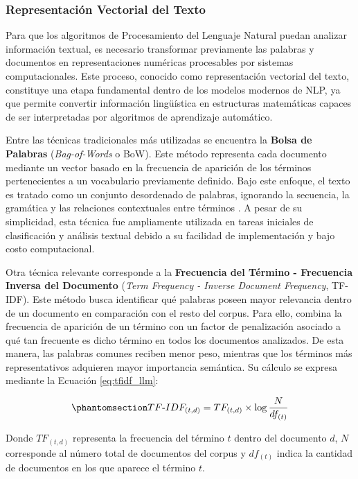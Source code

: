 \subsubsection{Representación Vectorial del Texto}

Para que los algoritmos de Procesamiento del Lenguaje Natural puedan analizar información textual, es necesario transformar previamente las palabras y documentos en representaciones numéricas procesables por sistemas computacionales. Este proceso, conocido como representación vectorial del texto, constituye una etapa fundamental dentro de los modelos modernos de NLP, ya que permite convertir información lingüística en estructuras matemáticas capaces de ser interpretadas por algoritmos de aprendizaje automático.

Entre las técnicas tradicionales más utilizadas se encuentra la \textbf{Bolsa de Palabras} (\textit{Bag-of-Words} o BoW). Este método representa cada documento mediante un vector basado en la frecuencia de aparición de los términos pertenecientes a un vocabulario previamente definido. Bajo este enfoque, el texto es tratado como un conjunto desordenado de palabras, ignorando la secuencia, la gramática y las relaciones contextuales entre términos \parencite{bk_brownlee2017deeplearning_nlp}. A pesar de su simplicidad, esta técnica fue ampliamente utilizada en tareas iniciales de clasificación y análisis textual debido a su facilidad de implementación y bajo costo computacional.

Otra técnica relevante corresponde a la \textbf{Frecuencia del Término - Frecuencia Inversa del Documento} (\textit{Term Frequency - Inverse Document Frequency}, TF-IDF). Este método busca identificar qué palabras poseen mayor relevancia dentro de un documento en comparación con el resto del corpus. Para ello, combina la frecuencia de aparición de un término con un factor de penalización asociado a qué tan frecuente es dicho término en todos los documentos analizados. De esta manera, las palabras comunes reciben menor peso, mientras que los términos más representativos adquieren mayor importancia semántica. Su cálculo se expresa mediante la Ecuación \ref{eq:tfidf_llm}:

\begin{equation}\label{eq:tfidf_llm}
\phantomsection
TF\text{-}IDF_{(t,d)} = TF_{(t,d)} \times \log\frac{N}{df_{(t)}}
\end{equation}

Donde $TF_{(t,d)}$ representa la frecuencia del término $t$ dentro del documento $d$, $N$ corresponde al número total de documentos del corpus y $df_{(t)}$ indica la cantidad de documentos en los que aparece el término $t$.

